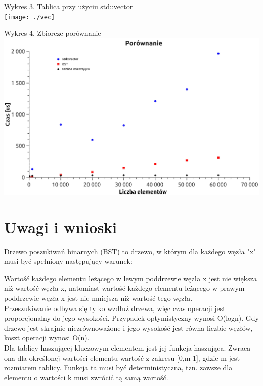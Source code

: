\documentclass[12pt,a4paper]{article}
\begin{document}
Wykres 3. Tablica przy użyciu std::vector\\

\texttt{[image: ./vec]}

\newpage

Wykres 4. Zbiorcze porównanie\\

\includegraphics[scale=0.6]{./zb}

\newpage

\section*{Uwagi i wnioski}

Drzewo poszukiwań binarnych (BST) to drzewo, w którym dla każdego węzła "x" musi być spełniony następujący warunek:

Wartość każdego elementu leżącego w lewym poddrzewie węzła x jest nie większa niż wartość węzła x, natomiast wartość każdego elementu leżącego w prawym poddrzewie węzła x jest nie mniejsza niż wartość tego węzła.
\\

Przeszukiwanie odbywa się tylko wzdłuż drzewa, więc czas operacji jest proporcjonalny do jego wysokości. Przypadek optymistyczny wynosi O(logn). Gdy drzewo jest skrajnie niezrównoważone i jego wysokość jest równa liczbie węzłów, koszt operacji wynosi O(n).\\ 

Dla tablicy haszującej kluczowym elementem jest jej funkcja haszująca. Zwraca ona dla określonej wartości elementu wartość z zakresu [0,m-1], gdzie m jest rozmiarem tablicy. Funkcja ta musi być deterministyczna, tzn. zawsze dla elementu o wartości k musi zwrócić tą samą wartość.
\\
\end{document}
